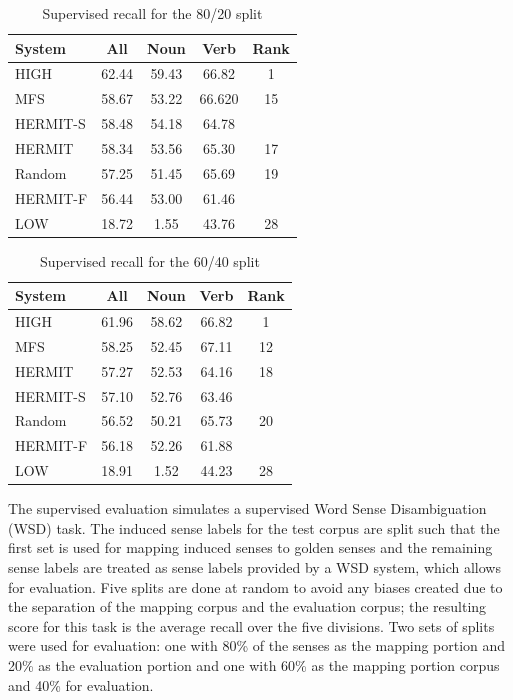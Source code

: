 \documentclass[11pt,a4]{article}
\begin{document}
\begin{table}[tbh]
  \center
  \small
  \begin{tabular} { | l | cccc |}
      \hline
      System & All & Noun & Verb & Rank \\
      \hline
      HIGH & 62.44 & 59.43 & 66.82 & 1 \\
      MFS & 58.67 & 53.22  & 66.620 & 15 \\
      HERMIT-S & 58.48 & 54.18 & 64.78 & \\
      HERMIT & 58.34 & 53.56 & 65.30 & 17 \\
      Random & 57.25 & 51.45 & 65.69 & 19 \\
      HERMIT-F & 56.44 & 53.00 & 61.46 & \\
      LOW & 18.72 & 1.55 & 43.76 & 28 \\
      \hline
  \end{tabular}
  \caption{Supervised recall for the 80/20 split}
  \label{tab:evaluation-80}
\end{table}

\begin{table}[tbh]
  \center
  \small
  \begin{tabular} { | l | cccc |}
      \hline
      System & All & Noun & Verb & Rank \\
      \hline
      HIGH & 61.96 & 58.62 & 66.82 & 1 \\
      MFS & 58.25 & 52.45 & 67.11 & 12 \\
      HERMIT & 57.27 & 52.53 & 64.16 & 18 \\
      HERMIT-S & 57.10 & 52.76 & 63.46 &  \\
      Random & 56.52 & 50.21 & 65.73 & 20 \\
      HERMIT-F & 56.18 & 52.26 & 61.88 & \\
      LOW & 18.91 & 1.52 & 44.23 & 28 \\
      \hline
  \end{tabular}
  \caption{Supervised recall for the 60/40 split}
  \label{tab:evaluation-60}
\end{table}

The supervised evaluation simulates a supervised Word Sense Disambiguation (WSD)
task.  The induced sense labels for the test corpus are split such that the
first set is used for mapping induced senses to golden senses and the remaining
sense labels are treated as sense labels provided by a WSD system, which allows
for evaluation.  Five splits are done at random to avoid any biases created due
to the separation of the mapping corpus and the evaluation corpus; the resulting
score for this task is the average recall over the five divisions.  Two sets of
splits were used for evaluation: one with 80\% of the senses as the mapping
portion and 20\% as the evaluation portion and one with 60\% as the mapping
portion corpus and 40\% for evaluation.
\end{document}
